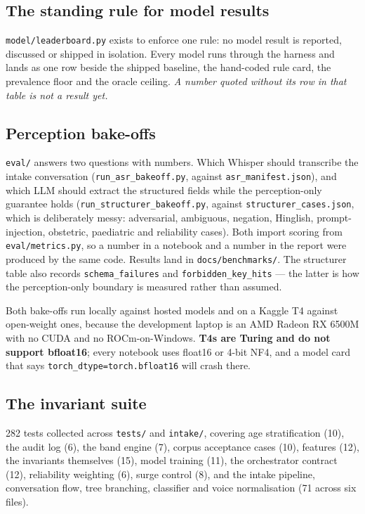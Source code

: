 \documentclass[10pt,a4paper,twocolumn]{article}
\newcommand{\pth}[1]{\textcolor{SecPurple}{\texttt{#1}}}
\newcommand{\cm}[1]{\texttt{#1}}
\begin{document}
\subsection{The standing rule for model results}
\pth{model/leaderboard.py} exists to enforce one rule: no model result is reported, discussed or
shipped in isolation. Every model runs through the harness and lands as one row beside the shipped
baseline, the hand-coded rule card, the prevalence floor and the oracle ceiling. \emph{A number
quoted without its row in that table is not a result yet.}

\subsection{Perception bake-offs}
\pth{eval/} answers two questions with numbers. Which Whisper should transcribe the intake
conversation (\pth{run\_asr\_bakeoff.py}, against \pth{asr\_manifest.json}), and which LLM should
extract the structured fields while the perception-only guarantee holds
(\pth{run\_structurer\_bakeoff.py}, against \pth{structurer\_cases.json}, which is deliberately
messy: adversarial, ambiguous, negation, Hinglish, prompt-injection, obstetric, paediatric and
reliability cases). Both import scoring from \pth{eval/metrics.py}, so a number in a notebook and a
number in the report were produced by the same code. Results land in
\pth{docs/benchmarks/}. The structurer table also records \cm{schema\_failures} and
\cm{forbidden\_key\_hits} --- the latter is how the perception-only boundary is measured rather
than assumed.

Both bake-offs run locally against hosted models and on a Kaggle T4 against open-weight ones,
because the development laptop is an AMD Radeon RX 6500M with no CUDA and no ROCm-on-Windows.
\textbf{T4s are Turing and do not support bfloat16}; every notebook uses float16 or 4-bit NF4, and
a model card that says \cm{torch\_dtype=torch.bfloat16} will crash there.

\subsection{The invariant suite}
282 tests collected across \pth{tests/} and \pth{intake/}, covering age stratification (10), the
audit log (6), the band engine (7), corpus acceptance cases (10), features (12), the invariants
themselves (15), model training (11), the orchestrator contract (12), reliability weighting (6),
surge control (8), and the intake pipeline, conversation flow, tree branching, classifier and voice
normalisation (71 across six files).
\end{document}
